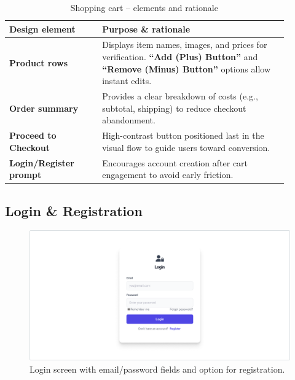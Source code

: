 \documentclass[12pt]{article}
\begin{document}
	\begin{table}[H]
		\centering
		\caption{Shopping cart – elements and rationale}
		\label{tab:cart-elements}

		\begin{tabular}{p{0.30\linewidth} p{0.60\linewidth}}
			\hline
        	\textbf{Design element} & \textbf{Purpose \& rationale} \\ 	\hline
				\textbf{Product rows}            & Displays item names, images, and prices for verification.
			                                     \textbf{``Add (Plus) Button''} and \textbf{``Remove (Minus) Button''} options allow instant edits. \\
				\textbf{Order summary}           & Provides a clear breakdown of costs (e.g., subtotal, shipping) to reduce checkout abandonment. \\
				\textbf{Proceed to Checkout}     & High-contrast button positioned last in the visual flow to guide users toward conversion. \\
				\textbf{Login/Register prompt}   & Encourages account creation after cart engagement to avoid early friction. \\
			\hline
    	\end{tabular}

	\end{table}



	\subsection{Login \& Registration}\label{subsec:login-register}

	\begin{figure}[H]
		\centering
		\includegraphics[width=1.0\linewidth]{pictures/main/LoginPage_Figma}%
		\caption{Login screen with email/password fields and option for registration.}
		\label{fig:ui-login}
	\end{figure}
\end{document}
